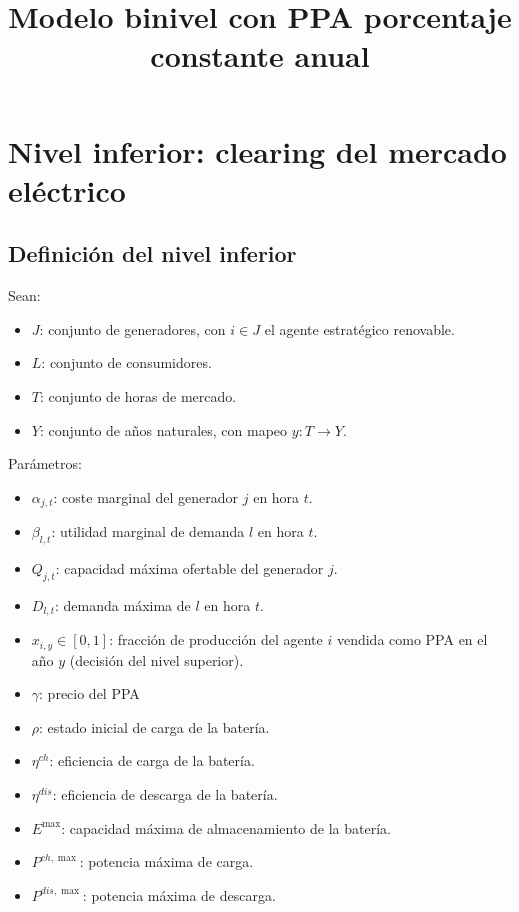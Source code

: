 \documentclass[a4paper,11pt]{article}
\title{Modelo binivel con PPA porcentaje constante anual}
\author{}
\date{}
\begin{document}
\maketitle

\section{Nivel inferior: clearing del mercado eléctrico}
\subsection{Definición del nivel inferior}

Sean:
\begin{itemize}
  \item $J$: conjunto de generadores, con $i \in J$ el agente estratégico renovable.
  \item $L$: conjunto de consumidores.
  \item $T$: conjunto de horas de mercado.
  \item $Y$: conjunto de años naturales, con mapeo $y:T\to Y$.
\end{itemize}


Parámetros:
\begin{itemize}
    \item $\alpha_{j,t}$: coste marginal del generador $j$ en hora $t$.
    \item $\beta_{l,t}$: utilidad marginal de demanda $l$ en hora $t$.
    \item $Q_{j,t}$: capacidad máxima ofertable del generador $j$.
    \item $D_{l,t}$: demanda máxima de $l$ en hora $t$.
    \item $x_{i,y} \in [0,1]$: fracción de producción del agente $i$ vendida como PPA en el año $y$ (decisión del nivel superior).
    \item $\gamma$: precio del PPA
    \item $\rho$: estado inicial de carga de la batería.
    \item $\eta^{ch}$: eficiencia de carga de la batería.
    \item $\eta^{dis}$: eficiencia de descarga de la batería.
    \item $E^{\max}$: capacidad máxima de almacenamiento de la batería.
    \item $P^{ch,\max}$: potencia máxima de carga.
    \item $P^{dis,\max}$: potencia máxima de descarga.
\end{itemize}
\end{document}
